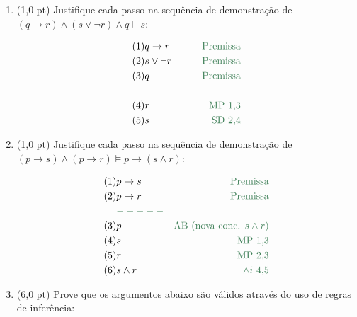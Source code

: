 \documentclass[11pt,a4paper,oneside]{article}
\begin{document}
\begin{enumerate}
{			Logo, de (5) e (7), temos que Marta não é estudante e Murilo não trabalha. Resposta correta: letra (b).
		}
	
	\item (1,0 pt) Justifique cada passo na sequência de demonstração de $(q \rightarrow r) \wedge (s \vee \neg r) \wedge q\models s$:
	
		\begin{eqnarray*}
			(1) & q \rightarrow r & {\color{verde} \mbox{Premissa}} \\
			(2) & s \vee \neg r & {\color{verde} \mbox{Premissa}}\\
			(3) & q & {\color{verde} \mbox{Premissa}}\\
			& {\color{verde} -----}& \\
			(4) & r & {\color{verde} \mbox{MP 1,3}}\\
			(5) & s & {\color{verde} \mbox{SD 2,4}} 
		\end{eqnarray*}	
	
	\item (1,0 pt) Justifique cada passo na sequência de demonstração de $(p \rightarrow s) \wedge (p \rightarrow r) \models p \rightarrow (s \wedge r)$:
	
		\begin{eqnarray*}
			(1) & p \rightarrow s & {\color{verde} \mbox{Premissa}}\\
			(2) & p \rightarrow r & {\color{verde} \mbox{Premissa}}\\
			& {\color{verde} -----}& \\
			(3) & p & {\color{verde} \mbox{AB (nova conc. } s \wedge r\mbox{)}}\\
			(4) & s & {\color{verde} \mbox{MP 1,3}}\\
			(5) & r & {\color{verde} \mbox{MP 2,3}}\\
			(6) & s \wedge r & {\color{verde} \wedge i \mbox{ 4,5}}
		\end{eqnarray*}	
		
	\item (6,0 pt) Prove que os argumentos abaixo são válidos através do uso de regras de inferência:
	

\end{enumerate}
\end{document}
